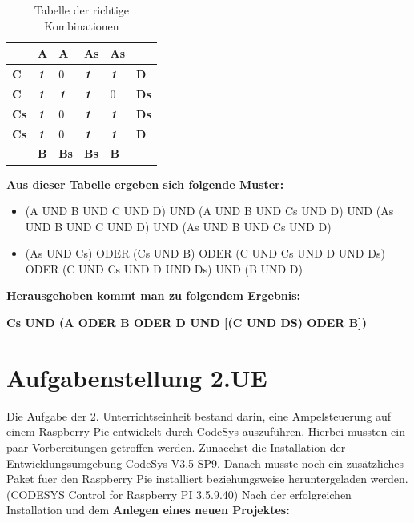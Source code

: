 \begin{table}[!h]
	\centering
	\caption{Tabelle der richtige Kombinationen}
	\label{UE1}
	\begin{tabular}{l|l|l|l|l|l}
		\cline{2-5}
		& \textbf{A}          & \textbf{A}          & \textbf{As}         & \textbf{As}         & \textbf{}                        \\ \hline
		\multicolumn{1}{|l|}{\textbf{C}}  & \textit{\textbf{1}} & 0                   & \textit{\textbf{1}} & \textit{\textbf{1}} & \multicolumn{1}{l|}{\textbf{D}}  \\ \hline
		\multicolumn{1}{|l|}{\textbf{C}}  & \textit{\textbf{1}} & \textit{\textbf{1}} & \textit{\textbf{1}} & 0                   & \multicolumn{1}{l|}{\textbf{Ds}} \\ \hline
		\multicolumn{1}{|l|}{\textbf{Cs}} & \textit{\textbf{1}} & 0                   & \textit{\textbf{1}} & \textit{\textbf{1}} & \multicolumn{1}{l|}{\textbf{Ds}} \\ \hline
		\multicolumn{1}{|l|}{\textbf{Cs}} & \textit{\textbf{1}} & 0                   & \textit{\textbf{1}} & \textit{\textbf{1}} & \multicolumn{1}{l|}{\textbf{D}}  \\ \hline
		& \textbf{B}          & \textbf{Bs}         & \textbf{Bs}         & \textbf{B}          & \textbf{}                        \\ \cline{2-5}
	\end{tabular}
\end{table}

\textbf{Aus dieser Tabelle ergeben sich folgende Muster:}
\begin{itemize}
	\item (A UND B UND C UND D) UND (A UND B UND Cs UND D) UND \newline (As UND B UND C UND D) UND (As UND B UND Cs UND D)
	\item (As UND Cs) ODER (Cs UND B) ODER (C UND Cs UND D UND Ds) ODER \newline (C UND Cs UND D UND Ds) UND (B UND D)
\end{itemize}
\textbf{Herausgehoben kommt man zu folgendem Ergebnis:}
\begin{center}
	\textbf{Cs UND (A ODER B ODER D UND [(C UND DS) ODER B])}
\end{center}
\newpage
\section{Aufgabenstellung 2.UE}
Die Aufgabe der 2. Unterrichtseinheit bestand darin, eine Ampelsteuerung auf einem Raspberry Pie entwickelt durch CodeSys auszuführen. Hierbei mussten ein paar Vorbereitungen getroffen werden. Zunaechst die Installation der Entwicklungsumgebung CodeSys V3.5 SP9. Danach musste noch ein zusätzliches Paket fuer den Raspberry Pie installiert beziehungsweise heruntergeladen werden. (CODESYS Control for Raspberry PI 3.5.9.40)
Nach der erfolgreichen Installation und dem \textbf{Anlegen eines neuen Projektes:}


